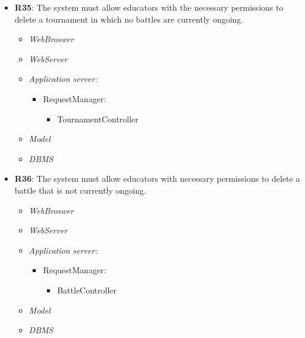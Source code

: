 \begin{itemize}
            
      \item \textbf{R35}: The system must allow educators with the necessary permissions to delete a tournament in which
no battles are currently ongoing.
            \begin{itemize}
                \item \textit{WebBroswer}
                \item \textit{WebServer}
                 \item \textit{Application server:}\begin{itemize}
                    \item RequestManager:\begin{itemize}
                        \item TournamentController
                    \end{itemize}
                \end{itemize}
                \item \textit{Model}
                \item \textit{DBMS}
            \end{itemize}


            
            \item \textbf{R36}: The system must allow educators with necessary permissions to delete a battle that is not currently
ongoing.
              \begin{itemize}
               \item \textit{WebBroswer}
                \item \textit{WebServer}
                \item \textit{Application server:}\begin{itemize}
                    \item RequestManager:\begin{itemize}
                        \item BattleController
                    \end{itemize}
                \end{itemize}
                \item \textit{Model}
                \item \textit{DBMS}
                \end{itemize}



\end{itemize}
